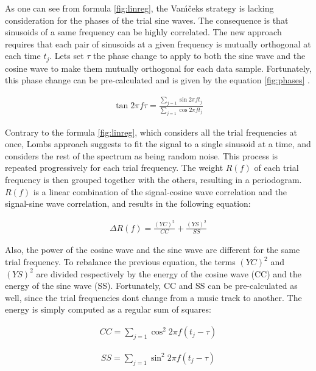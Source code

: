 \documentclass[letterpaper]{article}
\begin{document}
As one can see from formula \ref{fig:linreg}, the Van\'{\i}\v{c}ek\textquotesingle s strategy is lacking consideration for the phases of the trial sine waves.
The consequence is that sinusoids of a same frequency can be highly correlated. The new approach requires that each pair of sinusoids at a given frequency
is mutually orthogonal at each time $t_{j}$. Let\textquotesingle s set $\tau$ the phase change to apply to both the sine wave and the cosine wave to make
them mutually orthogonal for each data sample. Fortunately, this phase change can be pre-calculated and is given by the equation \ref{fig:phases} \citep{LS}.

\begin{align}
\tan 2\pi f \tau = \frac{\sum\limits_{j=1} \sin 2\pi f t_{j}}{\sum\limits_{j=1} \cos 2\pi f t_{j}}
\label{fig:phases}
\end{align}

Contrary to the formula \ref{fig:linreg}, which considers all the trial frequencies at once, Lomb\textquotesingle s approach suggests to fit the signal to a single sinusoid at a time, and considers the rest of the spectrum as being random noise. This process is repeated progressively for each trial frequency. The weight $R(f)$ of each trial frequency is then grouped together with the others, resulting in a periodogram. $R(f)$ is a linear combination of
the signal-cosine wave correlation and the signal-sine wave correlation, and results in the following equation:

\begin{align}
\Delta R(f) = \frac{(YC)^{2}}{CC} 
+ \frac{(YS)^{2}}{SS}
\label{fig:ccss}
\end{align}

Also, the power of the cosine wave and the sine wave are different for the same trial frequency. To rebalance the previous equation, the terms $(YC)^2$ and $(YS)^2$ are divided respectively by the energy of the cosine wave (CC) and the energy of the sine wave (SS).
Fortunately, CC and SS can be pre-calculated as well, since the trial frequencies don\textquotesingle t change from a music track to another. The energy is simply computed as a regular sum of squares:

\begin{align}
CC = \sum\limits_{j=1} \cos^{2} 2\pi f (t_{j} - \tau)
\label{fig:cc}
\end{align}

\begin{align}
SS = \sum\limits_{j=1} \sin^{2} 2\pi f (t_{j} - \tau)
\label{fig:ss}
\end{align}
\end{document}
